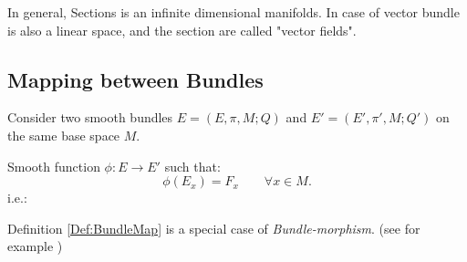 \documentclass[Main]{subfiles}
\begin{document}
			\begin{observation}
				In general, \gls{Sections} is an infinite dimensional manifolds. In case of vector bundle is also a linear space, and the section are called "vector fields".
			\end{observation}
			
			
		\subsection{Mapping between Bundles}
			Consider two smooth bundles $E=(E,\pi,M; Q)$ and $E'=(E',\pi',M; Q')$ on the same base space $M$.
			\begin{definition}\label{Def:BundleMap}
				Smooth function $\phi: E \rightarrow E'$ such that:			
			 	\begin{displaymath}
			 		\phi(E_{x})= F_{x} \qquad \forall x \in M.
			 	\end{displaymath}
				i.e.:
			\end{definition}
			\begin{observation}
				Definition \ref{Def:BundleMap} is a special case of \emph{Bundle-morphism}. (see for example \cite{G.Sardanashvily2013})
			\end{observation}
\end{document}
